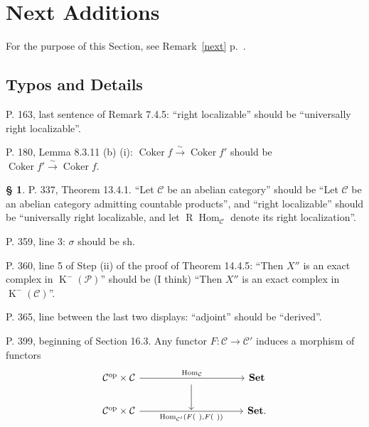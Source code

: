 \documentclass[12pt]{article}
\theoremstyle{remark}
\theoremstyle{definition}
\newtheorem{s}[thm]{\S}
\newcommand{\cc}{\mathcal}
\newcommand{\C}{\mathcal C}
\newcommand{\oo}{\operatorname}
\newcommand{\Set}{\mathbf{Set}}
\newcommand{\xr}{\xrightarrow}
\DeclareMathOperator{\Coker}{Coker}
\DeclareMathOperator{\Hom}{Hom}%
\DeclareMathOperator{\op}{op}
\begin{document}
\section{Next Additions} %
%
For the purpose of this Section, see Remark~\ref{next} p.~\pageref{next}.
%
\subsection{Typos and Details} %
%
\noindent P. 163, last sentence of Remark 7.4.5: ``right localizable'' should be ``universally right localizable''.

\noindent P. 180, Lemma 8.3.11 (b) (i): $\Coker f\xr\sim\Coker f'$ should be $\Coker f'\xr\sim\Coker f$.

\begin{s}\label{1341}
P. 337, Theorem 13.4.1. ``Let $\C$ be an abelian category'' should be ``Let $\C$ be an abelian category admitting countable products'', and ``right localizable'' should be ``universally right localizable, and let $\oo R\Hom_\C$ denote its right localization''.
\end{s}

\noindent P. 359, line 3: $\sigma$ should be sh.


\noindent P. 360, line 5 of Step (ii) of the proof of Theorem 14.4.5: ``Then $X''$ is an exact complex in $\oo K^-(\cc P)$'' should be (I think) ``Then $X''$ is an exact complex in $\oo K^-(\cc C)$''.


\noindent P. 365, line between the last two displays: ``adjoint'' should be ``derived''.


\noindent P. 399, beginning of Section 16.3. Any functor $F:\C\to\C'$ induces a morphism of functors 
$$
\begin{tikzcd}
%
\C^{\op}\times\C\ar{rrrr}{\Hom_\C}&&\ar{d}&&\Set\\ 
\C^{\op}\times\C\ar{rrrr}[swap]{\Hom_{\C'}(F(\ ),F(\ ))}&&{}&&\Set.
%
\end{tikzcd}
$$
\end{document}
